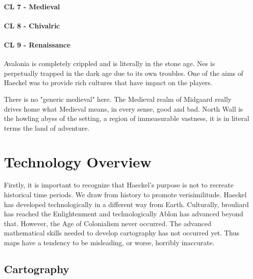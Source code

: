 \begin{multicols}{2}
\paragraph{CL 7 - Medieval}

\paragraph{CL 8 - Chivalric}

\paragraph{CL 9 - Renaissance}

Avalonia is completely crippled and is literally in the stone age. Nes is perpetually trapped in the dark age due to its own troubles. One of the aims of Haeckel was to provide rich cultures that have impact on the players. 

There is no "generic medieval" here. The Medieval realm of Midgaard really drives home what Medieval means, in every sense, good and bad. North Wall is the howling abyss of the setting, a region of immeasurable vastness, it is in literal terms the land of adventure.

\section{Technology Overview} 
Firstly, it is important to recognize that Haeckel's purpose is not to recreate historical time periods. We draw from history to promote verisimilitude. Haeckel has developed technologically in a different way from Earth. Culturally, brouliard has reached the Enlightenment and technologically Ablon has advanced beyond that. However, the Age of Colonialism never occurred. The advanced mathematical skills needed to develop cartography has not occurred yet. Thus maps have a tendency to be misleading, or worse, horribly inaccurate. 

\subsection{Cartography}


\end{multicols}

